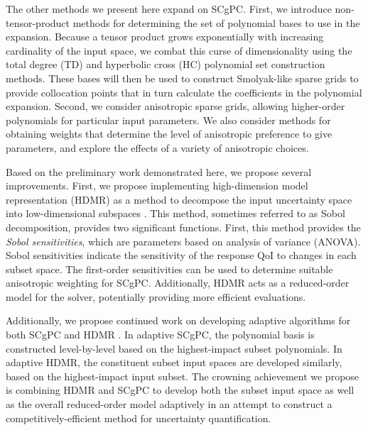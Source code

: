 The other methods we present here expand on
SCgPC.  First, we introduce non-tensor-product methods for determining the set of polynomial bases to
use in the expansion.  Because a tensor product grows exponentially with increasing cardinality of the input
space, we combat this curse of dimensionality using the 
total degree (TD) and hyperbolic cross (HC) polynomial set construction methods\cite{hctd}.
These bases will then be used to construct Smolyak-like sparse grids \cite{smolyak} to provide collocation
points that in turn calculate the coefficients in the polynomial expansion.  Second, we consider
anisotropic sparse grids,
allowing higher-order polynomials for particular input parameters.  We also consider methods for
obtaining weights that determine the level of anisotropic preference to give parameters, and explore the effects of a
variety of anisotropic choices.


Based on the preliminary work demonstrated here, we propose several improvements.  First, we propose
implementing high-dimension model representation (HDMR) as a method to decompose the input uncertainty space
into low-dimensional subspaces \cite{hdmr}.  This method, sometimes referred to as Sobol decomposition,
provides two significant functions.  First, this method provides the \emph{Sobol sensitivities}, which are
parameters based on analysis of variance (ANOVA).  Sobol sensitivities indicate the sensitivity of the
response QoI to changes in each subset space.  The first-order sensitivities can be used to determine suitable
anisotropic weighting for SCgPC.  Additionally, HDMR acts as a reduced-order model for the solver, potentially
providing more efficient evaluations.

Additionally, we propose continued work on developing adaptive algorithms for both SCgPC and HDMR \cite{Ayres}.  In adaptive
SCgPC, the polynomial basis is constructed level-by-level based on the highest-impact subset polynomials.  In
adaptive HDMR, the constituent subset input spaces are developed similarly, based on the highest-impact input
subset.  The crowning achievement we propose is combining HDMR and SCgPC to develop both the subset input
space as well as the overall reduced-order model adaptively in an attempt to construct a
competitively-efficient method for uncertainty quantification.

